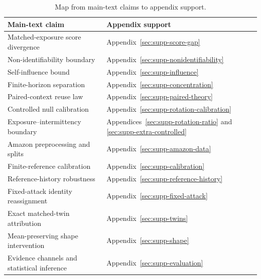 \begin{table}[t]
\caption{Map from main-text claims to appendix support.}
\label{tab:supp-map}
\centering
\small
\setlength{\tabcolsep}{4pt}
\renewcommand{\arraystretch}{1.08}
\begin{tabularx}{\columnwidth}{@{}
  >{\raggedright\arraybackslash}X
  >{\raggedright\arraybackslash}X@{}}
\toprule
\textbf{Main-text claim} & \textbf{Appendix support} \\
\midrule

Matched-exposure score divergence
&
Appendix~\ref{sec:supp-score-gap}
\\

Non-identifiability boundary
&
Appendix~\ref{sec:supp-nonidentifiability}
\\
Self-influence bound
&
Appendix~\ref{sec:supp-influence}
\\

Finite-horizon separation
&
Appendix~\ref{sec:supp-concentration}
\\

Paired-context reuse law
&
Appendix~\ref{sec:supp-paired-theory}
\\

Controlled null calibration
&
Appendix~\ref{sec:supp-rotation-calibration}
\\

Exposure--intermittency boundary
&
Appendices~\ref{sec:supp-rotation-ratio} and
\ref{sec:supp-extra-controlled}
\\

Amazon preprocessing and splits
&
Appendix~\ref{sec:supp-amazon-data}
\\

Finite-reference calibration
&
Appendix~\ref{sec:supp-calibration}
\\

Reference-history robustness
&
Appendix~\ref{sec:supp-reference-history}
\\

Fixed-attack identity reassignment
&
Appendix~\ref{sec:supp-fixed-attack}
\\

Exact matched-twin attribution
&
Appendix~\ref{sec:supp-twins}
\\

Mean-preserving shape intervention
&
Appendix~\ref{sec:supp-shape}
\\

Evidence channels and statistical inference
&
Appendix~\ref{sec:supp-evaluation}
\\


\end{tabularx}
\end{table}
